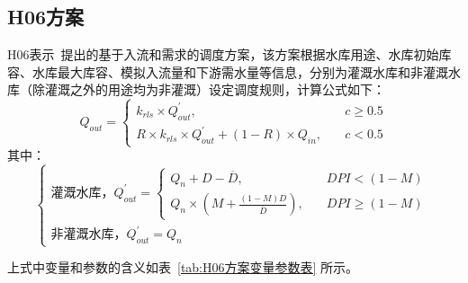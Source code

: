 \subsection{H06方案}
H06表示~\citet{hanasaki2006reservoir}提出的基于入流和需求的调度方案，该方案根据水库用途、水库初始库容、水库最大库容、模拟入流量和下游需水量等信息，分别为灌溉水库和非灌溉水库（除灌溉之外的用途均为非灌溉）设定调度规则，计算公式如下：
\begin{equation}
Q_{out}=\begin{cases}
k_{rls} \times Q_{out}^{'}, & \quad c \geqslant 0.5 \\
R \times k_{rls} \times Q_{out}^{'}+\left(1-R\right) \times Q_{in}, & \quad c<0.5
  \end{cases}
\end{equation}
%
其中：
\begin{equation}
\begin{cases}
\text{灌溉水库，} Q_{out}^{'}= \begin{cases}
Q_{n}+D-\overline{D}, &\quad DPI<(1-M)\\
Q_{n} \times \left(M+\frac{\left(1-M\right)D}{\overline{D}}\right), &\quad DPI \geqslant (1-M)
\end{cases}\\
\text{非灌溉水库，} Q_{out}^{'}=Q_{n}
\end{cases}
\end{equation}

上式中变量和参数的含义如表~\ref{tab:H06方案变量参数表} 所示。

